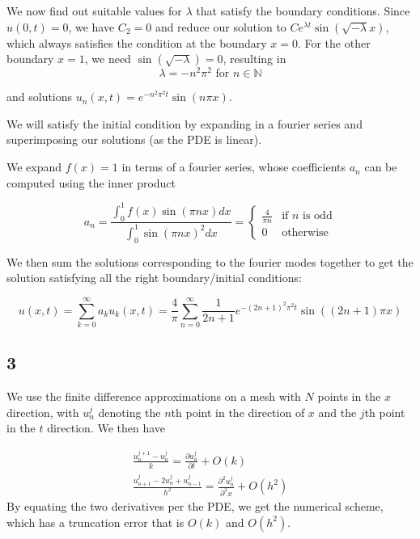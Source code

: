 \documentclass{article}
\numberwithin{equation}{section}
\theoremstyle{definition}
\newcommand{\pp}[2]{\frac{\partial #1}{\partial #2}}
\newcommand{\ppn}[3]{\frac{\partial^{#1} #2}{\partial^{#1} #3}}
\begin{document}
We now find out suitable values for $\lambda$ that satisfy the boundary conditions. Since $u(0,t) = 0$, we have $C_2 = 0$ and reduce our solution to $Ce^{\lambda t} \sin(\sqrt{-\lambda}x)$, which always satisfies the condition at the boundary $x=0$. For the other boundary $x=1$, we need $\sin(\sqrt{-\lambda}) = 0$, resulting in 
\begin{equation}
    \lambda = -n^2 \pi^2 \text{ for } n \in \mathbb{N}
\end{equation}

and solutions $u_n(x,t) = e^{-n^2 \pi^2 t} \sin(n\pi x)$.

We will satisfy the initial condition by expanding in a fourier series and superimposing our solutions (as the PDE is linear).

We expand $f(x)=1$ in terms of a fourier series, whose coefficients $a_n$ can be computed using the inner product

\begin{equation}
    a_n = \frac{\int_{0}^{1}f\left(x\right)\sin\left(\pi nx\right)dx}{\int_{0}^{1}\sin\left(\pi nx\right)^{2}dx} = \left\{\begin{matrix}
        \frac 4{\pi n} & \text{if $n$ is odd}\\ 
        0 & \text{otherwise}
        \end{matrix}\right.
\end{equation}

We then sum the solutions corresponding to the fourier modes together to get the solution satisfying all the right boundary/initial conditions:

\begin{equation}
    u(x,t) = \sum_{k=0}^{\infty} a_k u_k(x,t) = \frac {4}{\pi} \sum_{n=0}^{\infty} \frac{1}{2n+1} e^{-(2n+1)^2 \pi^2 t} \sin((2n+1)\pi x)
\end{equation}

\subsection{3}
We use the finite difference approximations on a mesh with $N$ points in the $x$ direction, with $u_n^j$ denoting the $n$th point in the direction of $x$ and the $j$th point in the $t$ direction. We then have

\begin{align}
    \frac{u_n^{j+1} - u_n^j}{k} = \pp{u_n^j}{t} + O(k) \\
    \frac{u_{n+1}^j - 2u_n^j + u_{n-1}^j}{h^2} = \ppn{2}{u_n^j}{x} + O(h^2)
\end{align}
By equating the two derivatives per the PDE, we get the numerical scheme, which has a truncation error that is $O(k)$ and $O(h^2)$.
\end{document}
